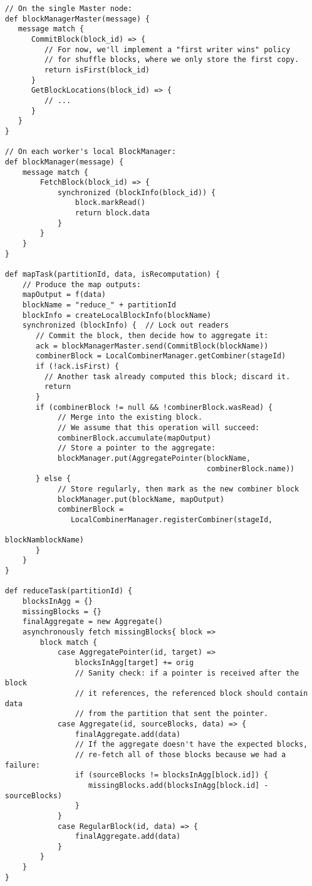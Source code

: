 \documentclass[12pt]{article}
\begin{document}
\begin{verbatim}
// On the single Master node:
def blockManagerMaster(message) {
   message match {
      CommitBlock(block_id) => {
         // For now, we'll implement a "first writer wins" policy
         // for shuffle blocks, where we only store the first copy.
         return isFirst(block_id)
      }
      GetBlockLocations(block_id) => {
         // ...
      }
   }
}

// On each worker's local BlockManager:
def blockManager(message) {
    message match {
        FetchBlock(block_id) => {
            synchronized (blockInfo(block_id)) {
                block.markRead()
                return block.data
            }
        }
    }
}

def mapTask(partitionId, data, isRecomputation) {
    // Produce the map outputs:
    mapOutput = f(data)
    blockName = "reduce_" + partitionId
    blockInfo = createLocalBlockInfo(blockName)
    synchronized (blockInfo) {  // Lock out readers
       // Commit the block, then decide how to aggregate it:
       ack = blockManagerMaster.send(CommitBlock(blockName))
       combinerBlock = LocalCombinerManager.getCombiner(stageId)
       if (!ack.isFirst) {
         // Another task already computed this block; discard it.
         return
       }
       if (combinerBlock != null && !combinerBlock.wasRead) {
            // Merge into the existing block.
            // We assume that this operation will succeed:
            combinerBlock.accumulate(mapOutput)
            // Store a pointer to the aggregate:
            blockManager.put(AggregatePointer(blockName,
                                              combinerBlock.name))
       } else {
            // Store regularly, then mark as the new combiner block
            blockManager.put(blockName, mapOutput)
            combinerBlock =
               LocalCombinerManager.registerCombiner(stageId,
                                                     blockNamblockName)
       }
    }
}

def reduceTask(partitionId) {
    blocksInAgg = {}
    missingBlocks = {}
    finalAggregate = new Aggregate()
    asynchronously fetch missingBlocks{ block =>
        block match {
            case AggregatePointer(id, target) =>
                blocksInAgg[target] += orig
                // Sanity check: if a pointer is received after the block
                // it references, the referenced block should contain data
                // from the partition that sent the pointer.
            case Aggregate(id, sourceBlocks, data) => {
                finalAggregate.add(data)
                // If the aggregate doesn't have the expected blocks,
                // re-fetch all of those blocks because we had a failure:
                if (sourceBlocks != blocksInAgg[block.id]) {
                   missingBlocks.add(blocksInAgg[block.id] - sourceBlocks)
                }
            }
            case RegularBlock(id, data) => {
                finalAggregate.add(data)
            }
        }
    }
}
\end{verbatim}
\end{document}
